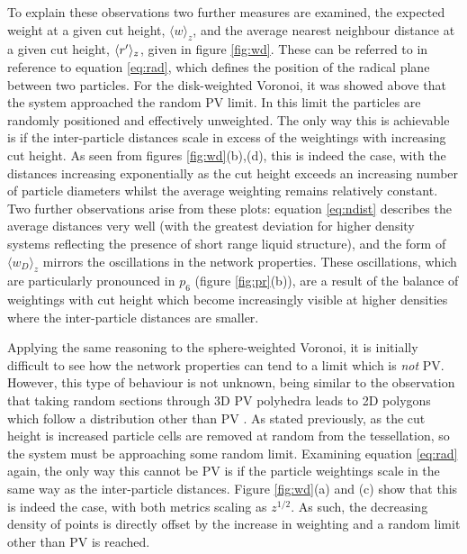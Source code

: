 To explain these observations two further measures are examined, the expected weight at a given cut height, $\langle w \rangle_z$, and the average nearest neighbour distance at a given cut height, $\langle r^\prime \rangle_z$, given in figure \ref{fig:wd}.
These can be referred to in reference to equation \eqref{eq:rad}, which defines the position of the radical plane between two particles.
For the disk\--weighted Voronoi, it was showed above that the system approached the random PV limit.
In this limit the particles are randomly positioned and effectively unweighted. 
The only way this is achievable is if the inter\--particle distances scale in excess of the weightings with increasing cut height.
As seen from figures \ref{fig:wd}(b),(d), this is indeed the case, with the distances increasing exponentially as the cut height exceeds an increasing number of particle diameters whilst the average weighting remains relatively constant.
Two further observations arise from these plots: equation \eqref{eq:ndist} describes the average distances very well (with the greatest deviation for higher density systems reflecting the presence of short range liquid structure), and the form of $\langle w_D\rangle_z$ mirrors the oscillations in the network properties.
These oscillations, which are particularly pronounced in $p_6$ (figure \ref{fig:pr}(b)), are a result of the balance of weightings with cut height which become increasingly visible at higher densities where the inter\--particle distances are smaller.

Applying the same reasoning to the sphere\--weighted Voronoi, it is initially difficult to see how the network properties can tend to a limit which is \textit{not} PV.
However, this type of behaviour is not unknown, being similar to the observation that taking random sections through 3D PV polyhedra leads to 2D polygons which follow a distribution other than PV \cite{Hahn1994}.
As stated previously, as the cut height is increased particle cells are removed at random from the tessellation, so the system must be approaching some random limit.
Examining equation \eqref{eq:rad} again, the only way this cannot be PV is if the particle weightings scale in the same way as the inter\--particle distances.
Figure \ref{fig:wd}(a) and (c) show that this is indeed the case, with both metrics scaling as $z^{1/2}$.
As such, the decreasing density of points is directly offset by the increase in weighting and a random limit other than PV is reached.

